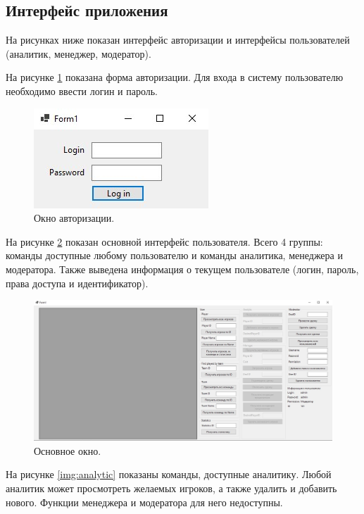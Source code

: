 \subsection{Интерфейс приложения}
На рисунках ниже показан интерфейс авторизации и интерфейсы пользователей (аналитик, менеджер, модератор).

На рисунке \ref{img:auth} показана форма авторизации. Для входа в систему пользователю необходимо ввести логин и пароль.
\begin{figure}[h!]
	\centering
	\includegraphics[scale=1]{img/auth.jpg}
	\caption{Окно авторизации.}
	\label{img:auth}
\end{figure}
\newpage
На рисунке \ref{img:main} показан основной интерфейс пользователя. Всего 4 группы: команды доступные любому пользователю и команды аналитика, менеджера и модератора. Также выведена информация о текущем пользователе (логин, пароль, права доступа и идентификатор).
\begin{figure}[h!]
	\centering
	\includegraphics[scale=0.4]{img/main.jpg}
	\caption{Основное окно.}
	\label{img:main}
\end{figure}
\clearpage
На рисунке \ref{img:analytic} показаны команды, доступные аналитику. Любой аналитик может просмотреть желаемых игроков, а также удалить и добавить нового. Функции менеджера и модератора для него недоступны.

